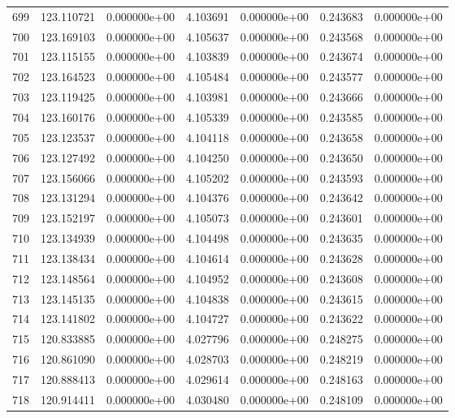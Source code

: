 \begin{tabular}{rrrrrrr}
 699 & 123.110721 &  0.000000e+00 &  4.103691 &  0.000000e+00 &    0.243683 &  0.000000e+00 \\
 700 & 123.169103 &  0.000000e+00 &  4.105637 &  0.000000e+00 &    0.243568 &  0.000000e+00 \\
 701 & 123.115155 &  0.000000e+00 &  4.103839 &  0.000000e+00 &    0.243674 &  0.000000e+00 \\
 702 & 123.164523 &  0.000000e+00 &  4.105484 &  0.000000e+00 &    0.243577 &  0.000000e+00 \\
 703 & 123.119425 &  0.000000e+00 &  4.103981 &  0.000000e+00 &    0.243666 &  0.000000e+00 \\
 704 & 123.160176 &  0.000000e+00 &  4.105339 &  0.000000e+00 &    0.243585 &  0.000000e+00 \\
 705 & 123.123537 &  0.000000e+00 &  4.104118 &  0.000000e+00 &    0.243658 &  0.000000e+00 \\
 706 & 123.127492 &  0.000000e+00 &  4.104250 &  0.000000e+00 &    0.243650 &  0.000000e+00 \\
 707 & 123.156066 &  0.000000e+00 &  4.105202 &  0.000000e+00 &    0.243593 &  0.000000e+00 \\
 708 & 123.131294 &  0.000000e+00 &  4.104376 &  0.000000e+00 &    0.243642 &  0.000000e+00 \\
 709 & 123.152197 &  0.000000e+00 &  4.105073 &  0.000000e+00 &    0.243601 &  0.000000e+00 \\
 710 & 123.134939 &  0.000000e+00 &  4.104498 &  0.000000e+00 &    0.243635 &  0.000000e+00 \\
 711 & 123.138434 &  0.000000e+00 &  4.104614 &  0.000000e+00 &    0.243628 &  0.000000e+00 \\
 712 & 123.148564 &  0.000000e+00 &  4.104952 &  0.000000e+00 &    0.243608 &  0.000000e+00 \\
 713 & 123.145135 &  0.000000e+00 &  4.104838 &  0.000000e+00 &    0.243615 &  0.000000e+00 \\
 714 & 123.141802 &  0.000000e+00 &  4.104727 &  0.000000e+00 &    0.243622 &  0.000000e+00 \\
 715 & 120.833885 &  0.000000e+00 &  4.027796 &  0.000000e+00 &    0.248275 &  0.000000e+00 \\
 716 & 120.861090 &  0.000000e+00 &  4.028703 &  0.000000e+00 &    0.248219 &  0.000000e+00 \\
 717 & 120.888413 &  0.000000e+00 &  4.029614 &  0.000000e+00 &    0.248163 &  0.000000e+00 \\
 718 & 120.914411 &  0.000000e+00 &  4.030480 &  0.000000e+00 &    0.248109 &  0.000000e+00 \\

\end{tabular}
